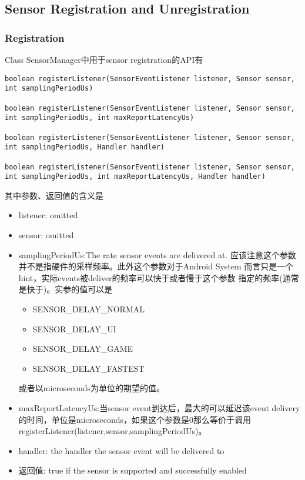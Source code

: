 {\subsection{Sensor Registration and Unregistration}
\subsubsection{Registration}
Class SensorManager中用于sensor registration的API有
\begin{lstlisting}
boolean registerListener(SensorEventListener listener, Sensor sensor, int samplingPeriodUs)

boolean registerListener(SensorEventListener listener, Sensor sensor, int samplingPeriodUs, int maxReportLatencyUs)

boolean registerListener(SensorEventListener listener, Sensor sensor, int samplingPeriodUs, Handler handler)

boolean registerListener(SensorEventListener listener, Sensor sensor, int samplingPeriodUs, int maxReportLatencyUs, Handler handler)
\end{lstlisting}
其中参数、返回值的含义是
\begin{itemize}
  \item listener: omitted
  \item sensor: omitted
  \item samplingPeriodUs:The rate sensor events are delivered at. 
    应该注意这个参数并不是指硬件的采样频率。此外这个参数对于Android System
    而言只是一个hint，实际events被deliver的频率可以快于或者慢于这个参数
    指定的频率(通常是快于)。实参的值可以是
      \begin{itemize}
        \item SENSOR\_DELAY\_NORMAL
        \item SENSOR\_DELAY\_UI
        \item SENSOR\_DELAY\_GAME
        \item SENSOR\_DELAY\_FASTEST
      \end{itemize}
      或者以microseconds为单位的期望的值。
  \item maxReportLatencyUs:当sensor event到达后，最大的可以延迟该event delivery
    的时间，单位是microseconds，如果这个参数是0那么等价于调用
    registerListener(listener,sensor,samplingPeriodUs)。
  \item handler: the handler the sensor event will be delivered to
  \item 返回值: true if the sensor is supported and successfully enabled
\end{itemize}


}
